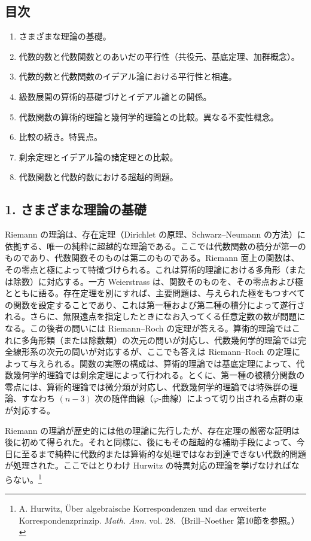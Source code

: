\documentclass[11pt]{article}
\begin{document}
\subsection*{目次}
\begin{enumerate}
\item さまざまな理論の基礎。
\item 代数的数と代数関数とのあいだの平行性（共役元、基底定理、加群概念）。
\item 代数的数と代数関数のイデアル論における平行性と相違。
\item 級数展開の算術的基礎づけとイデアル論との関係。
\item 代数関数の算術的理論と幾何学的理論との比較。異なる不変性概念。
\item 比較の続き。特異点。
\item 剰余定理とイデアル論の諸定理との比較。
\item 代数関数と代数的数における超越的問題。
\end{enumerate}

\subsection*{1. さまざまな理論の基礎}
Riemann の理論は、存在定理（Dirichlet の原理、Schwarz--Neumann の方法）に依拠する、唯一の純粋に超越的な理論である。ここでは代数関数の積分が第一のものであり、代数関数そのものは第二のものである。Riemann 面上の関数は、その零点と極によって特徴づけられる。これは算術的理論における多角形（または除数）に対応する。一方 Weierstrass は、関数そのものを、その零点および極とともに語る。存在定理を別にすれば、主要問題は、与えられた極をもつすべての関数を設定することであり、これは第一種および第二種の積分によって遂行される。さらに、無限遠点を指定したときになお入ってくる任意定数の数が問題になる。この後者の問いには Riemann--Roch の定理が答える。算術的理論ではこれに多角形類（または除数類）の次元の問いが対応し、代数幾何学的理論では完全線形系の次元の問いが対応するが、ここでも答えは Riemann--Roch の定理によって与えられる。関数の実際の構成は、算術的理論では基底定理によって、代数幾何学的理論では剰余定理によって行われる。とくに、第一種の被積分関数の零点には、算術的理論では微分類が対応し、代数幾何学的理論では特殊群の理論、すなわち \((n-3)\) 次の随伴曲線（\(\varphi\)-曲線）によって切り出される点群の束が対応する。

Riemann の理論が歴史的には他の理論に先行したが、存在定理の厳密な証明は後に初めて得られた。それと同様に、後にもその超越的な補助手段によって、今日に至るまで純粋に代数的または算術的な処理ではなお到達できない代数的問題が処理された。ここではとりわけ Hurwitz の特異対応の理論を挙げなければならない。\footnote{A. Hurwitz, Über algebraische Korrespondenzen und das erweiterte Korrespondenzprinzip. \emph{Math. Ann.} vol. 28.（Brill--Noether 第10節を参照。）}
\end{document}
